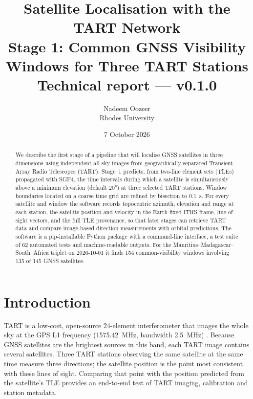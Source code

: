 \documentclass[11pt,a4paper]{article}
\title{\textbf{Satellite Localisation with the TART Network}\\[4pt]
\large Stage 1: Common GNSS Visibility Windows for Three TART Stations\\
\normalsize Technical report --- \code{tart\_gnss} v0.1.0}
\author{Nadeem Oozeer\\ Rhodes University}
\date{7 October 2026}
\begin{document}
\maketitle

\begin{abstract}
We describe the first stage of a pipeline that will localise GNSS satellites
in three dimensions using independent all-sky images from geographically
separated Transient Array Radio Telescopes (TART). Stage~1 predicts, from
two-line element sets (TLEs) propagated with SGP4, the time intervals during
which a satellite is simultaneously above a minimum elevation (default
\ang{20}) at three selected TART stations. Window boundaries located on a
coarse time grid are refined by bisection to \SI{0.1}{\second}. For every
satellite and window the software records topocentric azimuth, elevation and
range at each station, the satellite position and velocity in the Earth-fixed
ITRS frame, line-of-sight vectors, and the full TLE provenance, so that later
stages can retrieve TART data and compare image-based direction measurements
with orbital predictions. The software is a pip-installable Python package
with a command-line interface, a test suite of 62 automated tests and
machine-readable outputs. For the Mauritius--Madagascar--South~Africa triplet
on 2026-10-01 it finds 154 common-visibility windows involving 135 of 145 GNSS
satellites.
\end{abstract}

\tableofcontents

\section{Introduction}

TART is a low-cost, open-source 24-element interferometer that images the
whole sky at the GPS L1 frequency (\SI{1575.42}{\mega\hertz}, bandwidth
\SI{2.5}{\mega\hertz}) \cite{tart}. Because GNSS satellites are the brightest
sources in this band, each TART image contains several satellites. Three
TART stations observing the same satellite at the same time measure three
directions; the satellite position is the point most consistent with these
lines of sight. Comparing that point with the position predicted from the
satellite's TLE provides an end-to-end test of TART imaging, calibration and
station metadata.
\end{document}
